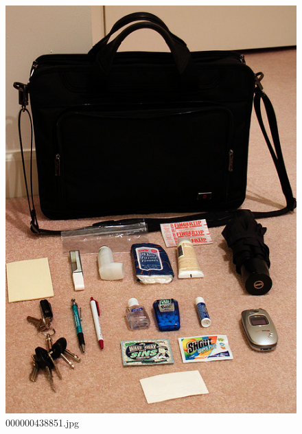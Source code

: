 \begin{figure}[h]
    \centering
    \includegraphics[width=0.8\linewidth]{../image set/hard/000000438851.jpg}
    \caption{000000438851.jpg}
\end{figure}
